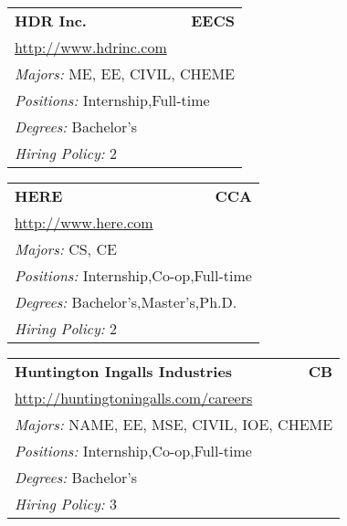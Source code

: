 \documentclass[twoside]{article}
\begin{document}
\begin{center}
\begin{multicols}{3}
\begin{FlushLeft}
\begin{minipage}{.9\columnwidth}
\end{minipage}
 
\begin{minipage}{.9\columnwidth}\begin{tabularx}{.95\columnwidth}{Xr}
                 {\Large\bf HDR Inc.} & {\Large\bf EECS}\\
    \multicolumn{2}{p{.95\columnwidth}}{\url{http://www.hdrinc.com}}\\
    \multicolumn{2}{p{.95\columnwidth}}{\emph{Majors:} ME, EE, CIVIL, CHEME}\\
    \multicolumn{2}{p{.95\columnwidth}}{\emph{Positions:} Internship,Full-time}\\
    \multicolumn{2}{p{.95\columnwidth}}{\emph{Degrees:} Bachelor's}\\
    \multicolumn{2}{p{.95\columnwidth}}{\emph{Hiring Policy:} 2}\\
    \end{tabularx}
    
\end{minipage}
 
\begin{minipage}{.9\columnwidth}\begin{tabularx}{.95\columnwidth}{Xr}
                 {\Large\bf HERE} & {\Large\bf CCA}\\
    \multicolumn{2}{p{.95\columnwidth}}{\url{http://www.here.com}}\\
    \multicolumn{2}{p{.95\columnwidth}}{\emph{Majors:} CS, CE}\\
    \multicolumn{2}{p{.95\columnwidth}}{\emph{Positions:} Internship,Co-op,Full-time}\\
    \multicolumn{2}{p{.95\columnwidth}}{\emph{Degrees:} Bachelor's,Master's,Ph.D.}\\
    \multicolumn{2}{p{.95\columnwidth}}{\emph{Hiring Policy:} 2}\\
    \end{tabularx}
    
\end{minipage}
 
\begin{minipage}{.9\columnwidth}\begin{tabularx}{.95\columnwidth}{Xr}
                 {\Large\bf Huntington Ingalls Industries} & {\Large\bf CB}\\
    \multicolumn{2}{p{.95\columnwidth}}{\url{http://huntingtoningalls.com/careers}}\\
    \multicolumn{2}{p{.95\columnwidth}}{\emph{Majors:} NAME, EE, MSE, CIVIL, IOE, CHEME}\\
    \multicolumn{2}{p{.95\columnwidth}}{\emph{Positions:} Internship,Co-op,Full-time}\\
    \multicolumn{2}{p{.95\columnwidth}}{\emph{Degrees:} Bachelor's}\\
    \multicolumn{2}{p{.95\columnwidth}}{\emph{Hiring Policy:} 3}\\
    \end{tabularx}
    

\end{minipage}
\end{FlushLeft}
\end{multicols}
\end{center}
\end{document}
